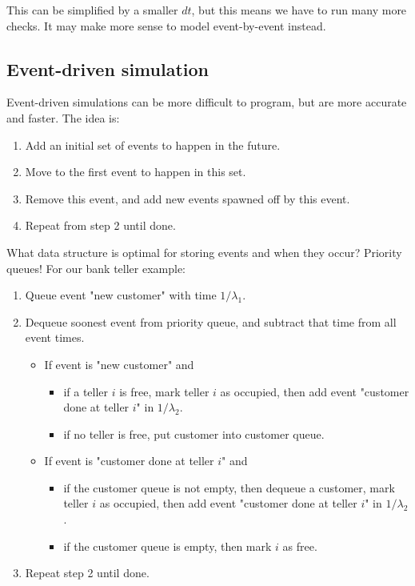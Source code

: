 \documentclass{article}
\begin{document}
This can be simplified by a smaller $dt$, but this means we have to run many more checks.  It may make more sense to model event-by-event instead.

\subsection{Event-driven simulation}
Event-driven simulations can be more difficult to program, but are more accurate and faster.  The idea is:

\begin{enumerate}
\item Add an initial set of events to happen in the future.
\item Move to the first event to happen in this set.
\item Remove this event, and add new events spawned off by this event.
\item Repeat from step 2 until done.
\end{enumerate}

What data structure is optimal for storing events and when they occur?  Priority queues!  For our bank teller example:
\begin{enumerate}
\item Queue event "new customer" with time $1/\lambda_1$.
\item Dequeue soonest event from priority queue, and subtract that time from all event times.
\begin{itemize}
\item If event is "new customer" and
\begin{itemize}
\item if a teller $i$ is free, mark teller $i$ as occupied, then add event "customer done at teller $i$" in $1/\lambda_2$.
\item if no teller is free, put customer into customer queue. 
\end{itemize}
\item If event is "customer done at teller $i$" and
\begin{itemize}
\item if the customer queue is not empty, then dequeue a customer, mark teller $i$ as occupied, then add event "customer done at teller $i$" in $1/\lambda_2$.
\item if the customer queue is empty, then mark $i$ as free.
\end{itemize}
\end{itemize}
\item Repeat step 2 until done.
\end{enumerate}
\end{document}
